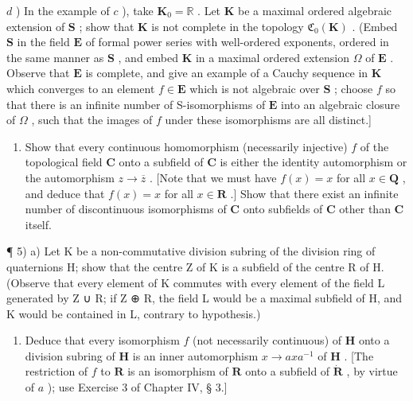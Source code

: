 \(d\) ) In the example of \(c\) ), take \(\mathbf{K}_0 = \mathbb{R}\) . Let \(\mathbf{K}\) be a maximal ordered algebraic extension of \(\mathbf{S}\) ; show that \(\mathbf{K}\) is not complete in the topology \(\mathfrak{C}_0(\mathbf{K})\) . (Embed \(\mathbf{S}\) in the field \(\mathbf{E}\) of formal power series with well-ordered exponents, ordered in the same manner as \(\mathbf{S}\) , and embed \(\mathbf{K}\) in a maximal ordered extension \(\Omega\) of \(\mathbf{E}\) . Observe that \(\mathbf{E}\) is complete, and give an example of a Cauchy sequence in \(\mathbf{K}\) which converges to an element \(f \in \mathbf{E}\) which is not algebraic over \(\mathbf{S}\) ; choose \(f\) so that there is an infinite number of S-isomorphisms of \(\mathbf{E}\) into an algebraic closure of \(\Omega\) , such that the images of \(f\) under these isomorphisms are all distinct.{]}

\begin{enumerate}
\def\labelenumi{\arabic{enumi})}
\setcounter{enumi}{3}
\tightlist
\item
  Show that every continuous homomorphism (necessarily injective) \(f\) of the topological field \(\mathbf{C}\) onto a subfield of \(\mathbf{C}\) is either the identity automorphism or the automorphism \(z \to \overline{z}\) . {[}Note that we must have \(f(x) = x\) for all \(x \in \mathbf{Q}\) , and deduce that \(f(x) = x\) for all \(x \in \mathbf{R}\) .{]} Show that there exist an infinite number of discontinuous isomorphisms of \(\mathbf{C}\) onto subfields of \(\mathbf{C}\) other than \(\mathbf{C}\) itself.
\end{enumerate}

¶ 5) a) Let K be a non-commutative division subring of the division ring of quaternions H; show that the centre Z of K is a subfield of the centre R of H. (Observe that every element of K commutes with every element of the field L generated by Z ∪ R; if Z ⊕ R, the field L would be a maximal subfield of H, and K would be contained in L, contrary to hypothesis.)

\begin{enumerate}
\def\labelenumi{\alph{enumi})}
\setcounter{enumi}{1}
\tightlist
\item
  Deduce that every isomorphism \(f\) (not necessarily continuous) of \(\mathbf{H}\) onto a division subring of \(\mathbf{H}\) is an inner automorphism \(x \to axa^{-1}\) of \(\mathbf{H}\) . {[}The restriction of \(f\) to \(\mathbf{R}\) is an isomorphism of \(\mathbf{R}\) onto a subfield of \(\dot{\mathbf{R}}\) , by virtue of \(a\) ); use Exercise 3 of Chapter IV, § 3.{]}
\end{enumerate}

